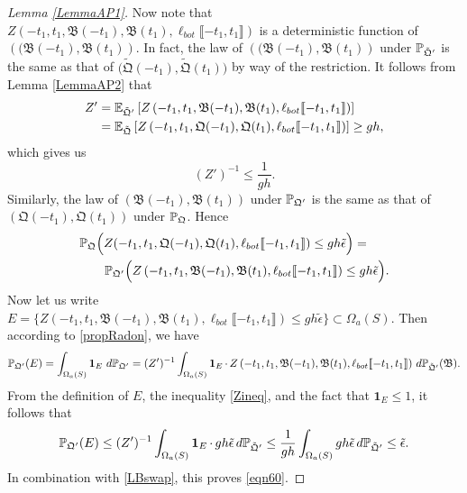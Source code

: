 \begin{proof}[Lemma \ref{LemmaAP1}]
	Now note that $Z\left(-t_1, t_1, \mathfrak B(-t_1), \mathfrak B(t_1), \ell_{bot}\llbracket -t_1, t_1\rrbracket\right)$ is a deterministic function of $\left((\mathfrak B(-t_1), \mathfrak B(t_1)\right)$. In fact, the law of $\left((\mathfrak B(-t_1), \mathfrak B(t_1)\right)$ under $\mathbb{P}_{\tilde{\mathfrak{Q}}'}$ is the same as that of $\big(\tilde{\mathfrak{Q}}(-t_1), \tilde{\mathfrak{Q}}(t_1)\big)$ by way of the restriction. It follows from Lemma \ref{LemmaAP2} that
	\begin{align*}
		Z' &= \mathbb{E}_{\tilde{\mathfrak{Q}}'}\left[Z\left(-t_1, t_1, \mathfrak B(-t_1), \mathfrak B(t_1), \ell_{bot}\llbracket -t_1, t_1\rrbracket\right)\right]\\
		&= \mathbb{E}_{\tilde{\mathfrak{Q}}}\left[Z\left(-t_1, t_1, \mathfrak{Q}(-t_1), \mathfrak{Q}(t_1), \ell_{bot}\llbracket -t_1, t_1\rrbracket\right)\right]\geq gh,
	\end{align*}	
	which gives us 
	\begin{equation}
		\label{Zineq} (Z')^{-1}\leq \frac{1}{gh}.
	\end{equation}
	Similarly,  the law of $\left(\mathfrak B(-t_1), \mathfrak{B}(t_1)\right)$ under $\mathbb{P}_{\mathfrak{Q}'}$ is the same as that of $\left(\mathfrak{Q}(-t_1), \mathfrak{Q}(t_1)\right)$ under $\mathbb{P}_{\mathfrak{Q}}$. Hence
	\begin{equation}\label{LBswap}
		\begin{split}
			&\mathbb{P}_{\mathfrak{Q}}\Big(Z(-t_1, t_1, \mathfrak{Q}(-t_1), \mathfrak{Q}(t_1), \ell_{bot}\llbracket -t_1, t_1\rrbracket)\leq gh\tilde \epsilon\Big)=\\
			&\qquad\mathbb{P}_{\mathfrak{Q}'}\Big(Z\left(-t_1, t_1, \mathfrak B(-t_1), \mathfrak B(t_1), \ell_{bot}\llbracket -t_1, t_1\rrbracket\right)\leq gh\tilde \epsilon\Big).
		\end{split}
	\end{equation}
	Now let us write $E=\{Z\left(-t_1, t_1, \mathfrak B(-t_1), \mathfrak B(t_1), \ell_{bot}\llbracket -t_1, t_1\rrbracket\right)\leq gh\tilde\epsilon\}\subset \Omega_a(S)$. Then according to \eqref{propRadon}, we have
	\[
	\mathbb{P}_{\mathfrak{Q}'}(E)=\int_{\Omega_a(S)} \operatorname{\mathbf{1}}_E\, d\mathbb{P}_{\mathfrak{Q}'} = (Z')^{-1}\int_{\Omega_a(S)}\operatorname{\mathbf{1}}_E \cdot\, Z\left(-t_1, t_1, \mathfrak B(-t_1), \mathfrak B(t_1), \ell_{bot}\llbracket -t_1, t_1\rrbracket\right)\, d\mathbb{P}_{\tilde{\mathfrak{Q}}'}(\mathfrak{B}).
	\]
	From the definition of $E$, the inequality \eqref{Zineq}, and the fact that $\mathbf{1}_E \leq 1$, it follows that
	\[
	\mathbb{P}_{\mathfrak{Q}'}(E)\leq (Z')^{-1}\int_{\Omega_a(S)} \operatorname{\mathbf{1}}_E\cdot\, gh\tilde{\epsilon}\, d\mathbb{P}_{\tilde{\mathfrak{Q}}'} \leq \frac{1}{gh}\int_{\Omega_a(S)} gh\tilde\epsilon\, d\mathbb{P}_{\tilde{\mathfrak{Q}}'}\leq \tilde{\epsilon}.
	\]
	In combination with \eqref{LBswap}, this proves \eqref{eqn60}.
	
\end{proof}
